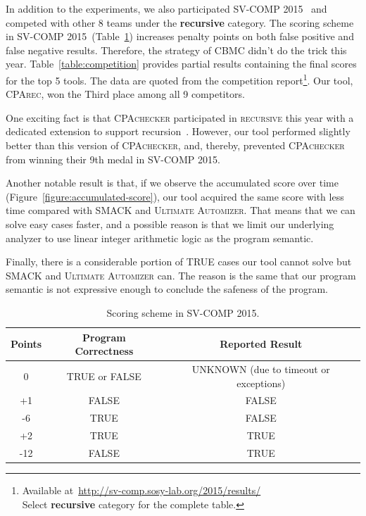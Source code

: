 In addition to the experiments, we also participated
SV-COMP 2015~\cite{svcomp15} and competed
with other 8 teams under the \textbf{recursive} category.
The scoring scheme in SV-COMP 2015~(Table~\ref{table:scoring-scheme-15})
increases penalty points on both false positive and false negative results.
Therefore, the strategy of \textsc{CBMC} didn't do the trick this year.
Table~\ref{table:competition} provides partial results containing the final
scores for the top 5 tools.
The data are quoted from the competition report\footnote{
  Available at~\url{http://sv-comp.sosy-lab.org/2015/results/} \\
  Select \textbf{recursive} category for the complete table.
}.
Our tool, \textsc{CPArec}, won the Third place among all 9 competitors.

One exciting fact is that \textsc{CPAchecker} participated in \textsc{recursive}
this year with a dedicated extension to support recursion~\cite{DanglLW15}.
However, our tool performed slightly better than this version of
\textsc{CPAchecker},
and, thereby, prevented \textsc{CPAchecker} from winning their 9th medal in
SV-COMP 2015.


Another notable result is that, if we observe the accumulated score over time
(Figure~\ref{figure:accumulated-score}), our tool acquired the same score with
less time compared with \textsc{SMACK} and \textsc{Ultimate Automizer}.
That means that we can solve easy cases faster,
and a possible reason is that we limit our underlying analyzer to use
linear integer arithmetic logic as the program semantic.

Finally, there is a considerable portion of TRUE cases our tool cannot solve
but \textsc{SMACK} and \textsc{Ultimate Automizer} can.
The reason is the same that our program semantic is not expressive enough to
conclude the safeness of the program.


\begin{table}
\caption{Scoring scheme in SV-COMP 2015.\label{table:scoring-scheme-15}}
\begin{center}
\begin{tabular}{|c|c|c|}
\hline
Points & Program Correctness & Reported Result \\\hline
0      & TRUE or FALSE & UNKNOWN (due to timeout or exceptions) \\
+1     & FALSE         & FALSE \\
-6     & TRUE          & FALSE \\
+2     & TRUE          & TRUE \\
-12    & FALSE         & TRUE \\\hline
\end{tabular}
\end{center}
\end{table}


